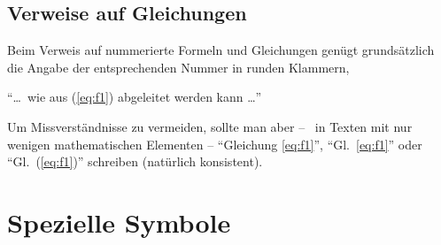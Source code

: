 \begin{comment}
\begin{equation}
\left[ \begin{array}{c}
  x' \\ y'
\end{array} \right] 
= 
\left[ \begin{array}{rr}
	 \cos \phi & \sin \phi \\
	-\sin \phi & \cos \phi
\end{array} \right] 
\cdot
\left[ \begin{array}{c}
	x \\ y
\end{array}
\right] 
.
\end{equation}
\end{comment}



\subsection{Verweise auf Gleichungen}
\label{sec:VerweiseAufGleichungen}

Beim Verweis auf nummerierte Formeln und Gleichungen genügt grundsätzlich die Angabe 
der entsprechenden Nummer in runden Klammern,
\zB\
\begin{center}
"`\ldots\ wie aus (\ref{eq:f1}) abgeleitet werden kann \ldots"'
\end{center}
Um Missverständnisse zu vermeiden, sollte man aber -- \va\ in Texten mit
nur wenigen mathematischen Elementen -- "`Gleichung \ref{eq:f1}"', "`Gl.~\ref{eq:f1}"' 
oder "`Gl.~(\ref{eq:f1})"' schreiben (natürlich konsistent). 

\begin{center}
\setlength{\fboxrule}{0.2mm}
\setlength{\fboxsep}{2mm}
\end{center}


\section{Spezielle Symbole}

